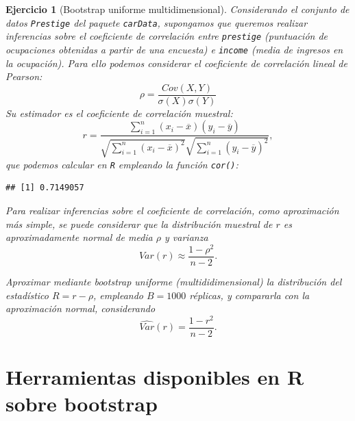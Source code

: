 \documentclass[
]{book}
\newenvironment{Shaded}{\begin{snugshade}}{\end{snugshade}}
\newcommand{\AttributeTok}[1]{\textcolor[rgb]{0.77,0.63,0.00}{#1}}
\newcommand{\CommentTok}[1]{\textcolor[rgb]{0.56,0.35,0.01}{\textit{#1}}}
\newcommand{\FunctionTok}[1]{\textcolor[rgb]{0.00,0.00,0.00}{#1}}
\newcommand{\NormalTok}[1]{#1}
\newcommand{\SpecialCharTok}[1]{\textcolor[rgb]{0.00,0.00,0.00}{#1}}
\newcommand{\StringTok}[1]{\textcolor[rgb]{0.31,0.60,0.02}{#1}}
\theoremstyle{break}
\newtheorem{exercise}{Ejercicio}[chapter]
\theoremstyle{nonumberplain}
\renewcommand{\CommentTok}[1]{\textcolor[rgb]{0.41,0.41,0.41}{\texttt{#1}}}
\begin{document}
\begin{exercise}[Bootstrap uniforme multidimensional]
\protect\hypertarget{exr:unif-multi}{}\label{exr:unif-multi}
Considerando el conjunto de datos \texttt{Prestige} del paquete \texttt{carData}, supongamos que queremos realizar inferencias sobre el coeficiente de correlación entre \texttt{prestige} (puntuación de ocupaciones obtenidas a partir de una encuesta) e \texttt{income} (media de ingresos en la ocupación).
Para ello podemos considerar el coeficiente de correlación lineal de Pearson:
\[\rho =\frac{ Cov \left( X, Y \right) }
{ \sigma \left( X \right) \sigma \left( Y \right) }\]
Su estimador es el coeficiente de correlación muestral:
\[r=\frac{\sum_{i=1}^{n}(x_i-\overline{x})(y_i-\overline{y})}
{\sqrt{ \sum_{i=1}^{n}(x_i-\overline{x})^{2}} 
\sqrt{\sum_{i=1}^{n}(y_i-\overline{y})^{2}}},\]
que podemos calcular en \texttt{R} empleando la función \texttt{cor()}:

\begin{Shaded}
\end{Shaded}

\begin{verbatim}
## [1] 0.7149057
\end{verbatim}

Para realizar inferencias sobre el coeficiente de correlación, como aproximación más simple, se puede considerar que la distribución muestral de \(r\) es aproximadamente normal de media \(\rho\) y varianza
\[Var(r) \approx \frac{1 - \rho^2}{n - 2}.\]

Aproximar mediante bootstrap uniforme (multididimensional) la distribución del estadístico \(R = r -\rho\), empleando \(B=1000\) réplicas, y compararla con la aproximación normal, considerando
\[\widehat{Var}(r) = \frac{1 - r^2}{n - 2}.\]
\end{exercise}

\hypertarget{intro-paquetes}{%
\section{Herramientas disponibles en R sobre bootstrap}\label{intro-paquetes}}
\end{document}
